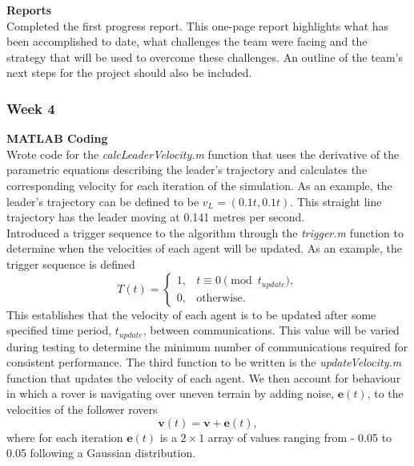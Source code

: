 \documentclass[../CourseManual.tex]{subfiles}
\begin{document}
\textbf{Reports}\\
Completed the first progress report. This one-page report highlights what has been accomplished to date, what challenges the team were facing and the strategy that will be used to overcome these challenges. An outline of the team's next steps for the project should also be included.

\subsubsection{Week 4} \label{Week 4: Flocking}
\textbf{MATLAB Coding}\\
Wrote code for the \textit{calcLeaderVelocity.m} function that uses the derivative of the parametric equations describing the leader's trajectory and calculates the corresponding velocity for each iteration of the simulation. As an example, the leader's trajectory can be defined to be $v_L = (0.1t, 0.1t)$. This straight line trajectory has the leader moving at 0.141 metres per second. \\

Introduced a trigger sequence to the algorithm through the \textit{trigger.m} function to determine when the velocities of each agent will be updated. As an example, the trigger sequence is defined
\[
T(t) =
\begin{cases}
1, & \text{$t \equiv 0 \pmod{t_{update}},$}\\
0, & \text{otherwise.}
\end{cases}
\]
This establishes that the velocity of each agent is to be updated after some specified time period, $t_{update}$, between communications. This value will be varied during testing to determine the minimum number of communications required for consistent performance. The third function to be written is the \textit{updateVelocity.m} function that updates the velocity of each agent. We then account for behaviour in which a rover is navigating over uneven terrain by adding noise, $\boldsymbol{e}(t)$, to the velocities of the follower rovers
\[
\boldsymbol{v}(t) = \boldsymbol{v} + \boldsymbol{e}(t),
\]
where for each iteration $\boldsymbol{e}(t)$ is a $2 \times 1$ array of values ranging from - 0.05 to 0.05 following a Gaussian distribution.\\ 
\end{document}
